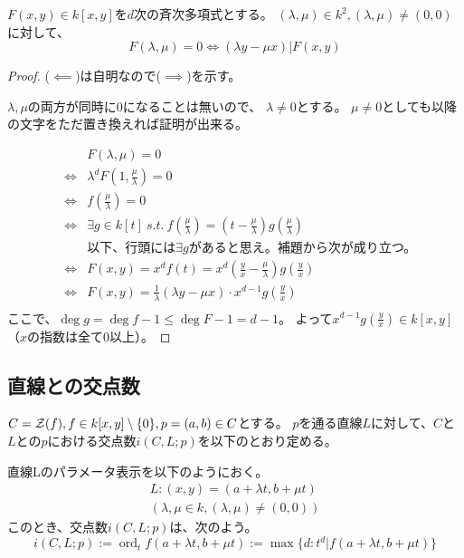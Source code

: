\documentclass[a4paper]{jsarticle}
\begin{document}
    \begin{Prop}
        $F(x, y) \in k[x,y]$を$d$次の斉次多項式とする。
        $(\lambda, \mu) \in k^2, (\lambda, \mu) \neq (0, 0)$に対して、
        \[
            F(\lambda, \mu)=0 \iff (\lambda y -\mu x) | F(x, y)
        \]
    \end{Prop}
    \begin{proof}
        ($\impliedby$)は自明なので($\implies$)を示す。

        $\lambda, \mu$の両方が同時に0になることは無いので、
        $\lambda \neq 0$とする。
        $\mu \neq 0$としても以降の文字をただ置き換えれば証明が出来る。

        \begin{eqnarray*}
            &{}& F\left(\lambda, \mu\right)=0 \\
            &\iff& \lambda^{d} F\left(1, \frac{\mu}{\lambda}\right)=0 \\
            &\iff& f\left(\frac{\mu}{\lambda}\right)=0 \\
            &\iff& \exists g \in k[t] ~s.t.~
                f\left(\frac{\mu}{\lambda}\right) = \left(t-\frac{\mu}{\lambda}\right) g\left(\frac{\mu}{\lambda}\right) \\
            &{}&\mbox{以下、行頭には$\exists g$があると思え。補題から次が成り立つ。} \\
            &\iff& F(x, y)=x^d f(t)=x^d \left(\frac{y}{x}-\frac{\mu}{\lambda}\right) g\left(\frac{y}{x}\right) \\
            &\iff& F(x, y)=\frac{1}{\lambda} (\lambda y - \mu x)\cdot x^{d-1}g\left(\frac{y}{x}\right) \\
        \end{eqnarray*}
        ここで、$\deg g = \deg f -1 \leq \deg F -1 =d-1$。
        よって$x^{d-1}g\left(\frac{y}{x}\right) \in k[x, y]$（$x$の指数は全て0以上）。

        
    \end{proof}

    \subsection{直線との交点数}
    $C=\mathcal{Z}(f), f \in k[x, y] \setminus \{0\}, p=(a, b) \in C$とする。
    $p$を通る直線$L$に対して、$C$と$L$との$p$における交点数$i(C, L; p)$を以下のとおり定める。
    
    \begin{Def}
        直線Lのパラメータ表示を以下のようにおく。
        \begin{gather*}
            L: (x, y)=(a+ \lambda t, b+ \mu t) \\
            (\lambda, \mu \in k, (\lambda, \mu) \neq (0, 0))
        \end{gather*}
        このとき、交点数$i(C, L; p)$は、次のよう。
        \[
            i(C, L; p)
              :=\operatorname{ord}_{t} f(a+ \lambda t, b+ \mu t)
              :=\max \{d : t^d | f(a+ \lambda t, b+ \mu t) \}
        \]
    \end{Def}
    
\end{document}
